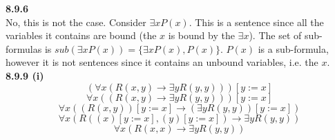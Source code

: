 \noindent \textbf{8.9.6} \\ No, this is not the case. Consider $\exists x P(x)$. This is a sentence since all the variables it contains are bound (the $x$ is bound by the $\exists x$). The set of sub-formulas is $sub(\exists x P(x)) = \{\exists x P(x), P(x)\}$. $P(x)$ is a sub-formula, however it is not sentences since it contains an unbound variables, i.e. the $x$.\\
\newline
\noindent \textbf{8.9.9 (i)} \\
$$(\forall x(R(x,y) \rightarrow \exists y R(y,y)))[y := x]$$
$$\forall x((R(x,y) \rightarrow \exists y R(y,y)))[y := x]$$ 
$$\forall x((R(x,y))[y := x] \rightarrow (\exists y R(y,y))[y := x])$$
$$\forall x(R((x)[y := x],(y)[y := x]) \rightarrow \exists y R(y,y))$$
$$\forall x(R(x,x) \rightarrow \exists y R(y,y))$$


